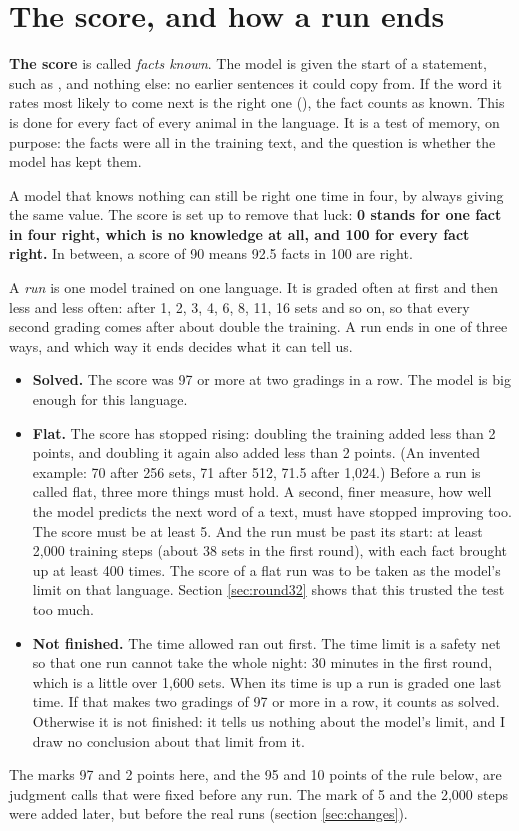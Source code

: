 \section{The score, and how a run ends}\label{sec:score}

\textbf{The score} is called \emph{facts known}. The model is given the start of a statement,
such as , and nothing else: no earlier sentences it could copy from. If the word
it rates most likely to come next is the right one (), the fact counts as known. This
is done for every fact of every animal in the language. It is a test of memory, on purpose:
the facts were all in the training text, and the question is whether the model has kept them.

A model that knows nothing can still be right one time in four, by always giving the same
value. The score is set up to remove that luck: \textbf{0 stands for one fact in four right,
which is no knowledge at all, and 100 for every fact right.} In between, a score of 90 means
92.5 facts in 100 are right.

A \emph{run} is one model trained on one language. It is graded often at first and then less
and less often: after 1, 2, 3, 4, 6, 8, 11, 16 sets and so on, so that every second grading
comes after about double the training. A run ends in one of three ways, and which way it ends
decides what it can tell us.
\begin{itemize}
\item \textbf{Solved.} The score was 97 or more at two gradings in a row. The model is big
      enough for this language.
\item \textbf{Flat.} The score has stopped rising: doubling the training added less than 2
      points, and doubling it again also added less than 2 points. (An invented example: 70
      after 256 sets, 71 after 512, 71.5 after 1,024.) Before a run is called flat, three more
      things must hold. A second, finer measure, how well the model predicts the next word of
      a text, must have stopped improving too. The score must be at least 5. And the run must
      be past its start: at least 2,000 training steps (about 38 sets in the first round),
      with each fact brought up at least 400 times. The score of a flat run was to be taken as
      the model's limit on that language. Section \ref{sec:round32} shows that this trusted
      the test too much.
\item \textbf{Not finished.} The time allowed ran out first. The time limit is a safety net so
      that one run cannot take the whole night: 30 minutes in the first round, which is a
      little over 1,600 sets. When its time is up a run is graded one last time. If that makes two gradings
      of 97 or more in a row, it counts as solved. Otherwise it is not finished: it tells us
      nothing about the model's limit, and I draw no conclusion about that limit from it.
\end{itemize}
The marks 97 and 2 points here, and the 95 and 10 points of the rule below, are judgment calls
that were fixed before any run. The mark of 5 and the 2,000 steps were added later, but
before the real runs (section \ref{sec:changes}).


